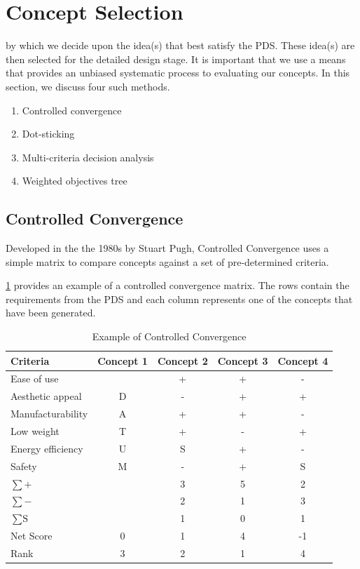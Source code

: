 \section{Concept Selection} 

 by which we decide upon the idea(s) that best satisfy the \ac{PDS}. These idea(s) are then selected for the detailed design stage.
It is important that we use a means that provides an unbiased systematic process to evaluating our concepts. In this section, we discuss four such methods.

\begin{enumerate}
    \item Controlled convergence
    \item Dot-sticking
    \item Multi-criteria decision analysis
    \item Weighted objectives tree
\end{enumerate}

\subsection{Controlled Convergence} Developed in the the 1980s by Stuart Pugh\cite{pugh1993}, Controlled Convergence uses a simple matrix to compare concepts against a set of pre-determined criteria.

\cref{tbl-controlled-convergence} provides an example of a controlled convergence matrix. The rows contain the requirements from the \ac{PDS} and each column represents one of the concepts that have been generated.

\begin{table}[ht!]
    \center
    \small
    \caption{Example of Controlled Convergence}
    \begin{tabular}{l c c c c}
        \toprule
        Criteria & Concept 1 & Concept 2 & Concept 3 & Concept 4 \\
        \midrule
        Ease of use &  & + & + & - \\
        Aesthetic appeal & D & - & + & + \\
        Manufacturability & A & + & + & - \\
        Low weight & T & + & - & + \\
        Energy efficiency & U & S & + & - \\
        Safety & M & - & + & S \\
        $\sum+$ & & 3 & 5 & 2 \\
        $\sum-$ & & 2 & 1 & 3 \\
        $\sum\text{S}$ & & 1 & 0 & 1 \\
        \midrule
        Net Score & 0 & 1 & 4 & -1 \\
        Rank & 3 & 2 & 1 & 4 \\
        \bottomrule
    \end{tabular}
    \label{tbl-controlled-convergence}
\end{table}

